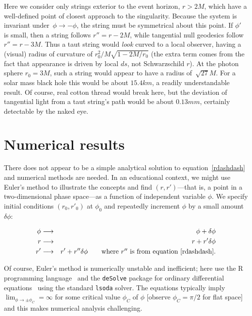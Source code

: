 \documentclass[review]{elsarticle}
\begin{document}
Here we consider only strings exterior to the event horizon, $r>2M$,
which have a well-defined point of closest approach to the
singularity.  Because the system is invariant
under~$\phi\longrightarrow-\phi$, the string must be symmetrical about
this point.  If $\phi'$ is small, then a string follows $r''=r-2M$,
while tangential null geodesics follow $r''=r-3M$.  Thus a taut string
would {\em look} curved to a local observer, having a (visual) radius
of curvature of $r_0^2/M\sqrt{1-2M/r_0}$ (the extra term comes from
the fact that appearance is driven by local $ds$, not Schwarzschild
$r$).  At the photon sphere $r_0=3M$, such a string would appear to
have a radius of~$\sqrt{27}M$.  For a solar mass black hole this would
be about $15.4\unit{km}$, a readily understandable result.  Of course,
real cotton thread would break here, but the deviation of tangential
light from a taut string's path would be about $0.13\unit{mm}$,
certainly detectable by the naked eye.
\section{Numerical results}

There does not appear to be a simple analytical solution to
equation~\ref{rdashdash} and numerical methods are needed.  In an
educational context, we might use Euler's method to illustrate the
concepts and find $\left(r,r'\right)$---that is, a point in a
two-dimensional phase space---as a function of independent variable
$\phi$.  We specify initial conditions $(r_0,r'_0)$ at $\phi_0$ and
repeatedly increment $\phi$ by a small amount $\delta\phi$:

\begin{eqnarray}
\phi&\longrightarrow&\phi+\delta\phi\nonumber\\
r   &\longrightarrow&r+r'\delta\phi\nonumber\\
r'  &\longrightarrow&r' + r''\delta\phi\qquad\mbox{where $r''$ is from equation~\ref{rdashdash}.}
\end{eqnarray}

Of course, Euler's method is numerically unstable and inefficient;
here use the R programming language~\cite{rcore2019} and the
\verb+deSolve+ package for ordinary differential
equations~\cite{soetart2010} using the standard \verb+lsoda+ solver.
The equations typically imply
$\displaystyle\lim_{\phi\longrightarrow\pm\phi_C}=\infty$ for some
critical value $\phi_C$ of $\phi$ [observe $\phi_C=\pi/2$ for flat
  space] and this makes numerical analysis challenging.
\end{document}
